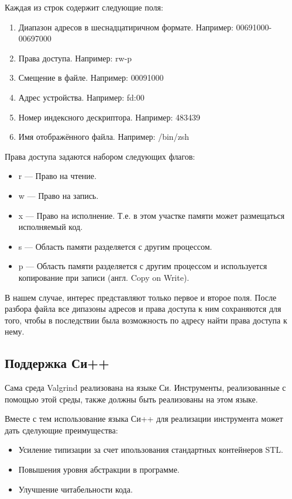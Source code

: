 \documentclass[a4paper,12pt,russian]{article}
\newcommand{\code}[1]{\textsf{#1}}
\begin{document}
Каждая из строк содержит следующие поля:
\begin{enumerate}
    \item Диапазон адресов в шеснадцатиричном формате. Например: \code{00691000-00697000}
    \item Права доступа. Например: \code{rw-p}
    \item Смещение в файле. Например: \code{00091000}
    \item Адрес устройства. Например: \code{fd:00}
    \item Номер индексного дескриптора. Например: \code{483439}
    \item Имя отображённого файла. Например: \code{/bin/zsh}
\end{enumerate}

Права доступа задаются набором следующих флагов:
\begin{itemize}
    \item \code{r} --- Право на чтение.
    \item \code{w} --- Право на запись.
    \item \code{x} --- Право на исполнение. Т.е. в этом участке памяти может размещаться исполняемый код.
    \item \code{s} --- Область памяти разделяется с другим процессом.
    \item \code{p} --- Область памяти разделяется с другим процессом и используется копирование при записи (англ. Copy on Write).
\end{itemize}

В нашем случае, интерес представляют только первое и второе поля.
После разбора файла все дипазоны адресов и права доступа к ним сохраняются для того, чтобы в последствии была возможность по адресу найти права доступа к нему.

\subsection{Поддержка Си++}
Сама среда \code{Valgrind} реализована на языке Си. Инструменты, реализованные с помощью этой среды, также должны быть реализованы на этом языке.

Вместе с тем использование языка Си++ для реализации инструмента может дать сделующие преимущества:
\begin{itemize}
    \item Усиление типизации за счет ипользования стандартных контейнеров \code{STL}.
    \item Повышения уровня абстракции в программе.
    \item Улучшение читабельности кода.
\end{itemize}
\end{document}
